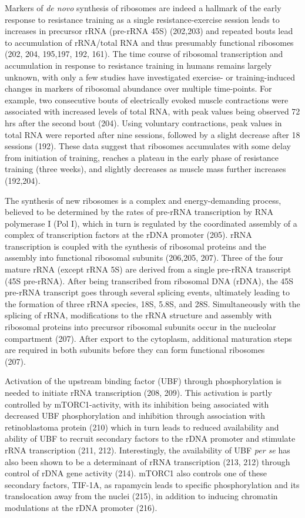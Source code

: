 \documentclass[twoside,10pt]{gihclass} %
\begin{document}
Markers of \emph{de novo} synthesis of ribosomes are indeed a hallmark of the early response to resistance training as a single resistance-exercise session leads to increases in precursor rRNA (pre-rRNA 45S)
(202,203)
and repeated bouts lead to accumulation of rRNA/total RNA and thus presumably functional ribosomes
(202, 204, 195,197, 192, 161).
The time course of ribosomal transcription and accumulation in response to resistance training in humans remains largely unknown, with only a few studies have investigated exercise- or training-induced changes in markers of ribosomal abundance over multiple time-points.
For example, two consecutive bouts of electrically evoked muscle contractions were associated with increased levels of total RNA, with peak values being observed 72 hrs after the second bout
(204).
Using voluntary contractions, peak values in total RNA were reported after nine sessions, followed by a slight decrease after 18 sessions (192).
These data suggest that ribosomes accumulates with some delay from initiation of training, reaches a plateau in the early phase of resistance training (three weeks), and slightly decreases as muscle mass further increases
(192,204).

The synthesis of new ribosomes is a complex and energy-demanding process, believed to be determined by the rates of pre-rRNA transcription by RNA polymerase I (Pol I), which in turn is regulated by the coordinated assembly of a complex of transcription factors at the rDNA promoter
(205).
rRNA transcription is coupled with the synthesis of ribosomal proteins and the assembly into functional ribosomal subunits
(206,205, 207).
Three of the four mature rRNA (except rRNA 5S) are derived from a single pre-rRNA transcript (45S pre-rRNA). After being transcribed from ribosomal DNA (rDNA), the 45S pre-rRNA transcript goes through several splicing events, ultimately leading to the formation of three rRNA species, 18S, 5.8S, and 28S. Simultaneously with the splicing of rRNA, modifications to the rRNA structure and assembly with ribosomal proteins into precursor ribosomal subunits occur in the nucleolar compartment
(207).
After export to the cytoplasm, additional maturation steps are required in both subunits before they can form functional ribosomes\\
(207).

Activation of the upstream binding factor (UBF) through phosphorylation is needed to initiate rRNA transcription
(208, 209).
This activation is partly controlled by mTORC1-activity, with its inhibition being associated with decreased UBF phosphorylation and inhibition through association with retinoblastoma protein
(210)
which in turn leads to reduced availability and ability of UBF to recruit secondary factors to the rDNA promoter and stimulate rRNA transcription
(211, 212).
Interestingly, the availability of UBF \emph{per se} has also been shown to be a determinant of rRNA transcription
(213, 212)
through control of rDNA gene activity
(214).
mTORC1 also controls one of these secondary factors, TIF-1A, as rapamycin leads to specific phosphorylation and its translocation away from the nuclei
(215),
in addition to inducing chromatin modulations at the rDNA promoter
(216).
\end{document}
